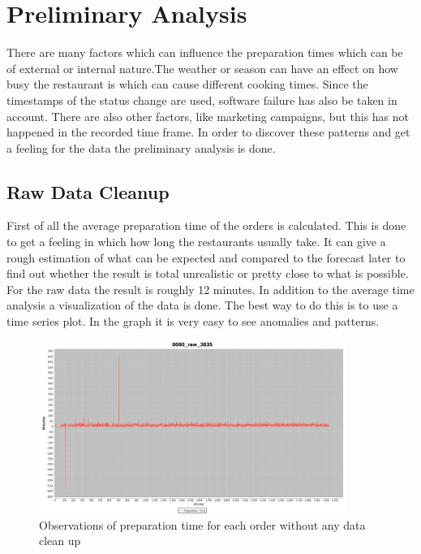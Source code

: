 \section{Preliminary Analysis}\label{section:Preliminary Analysis}
There are many factors which can influence the preparation times which can be of external or internal nature.The weather or season can have an effect on how busy the restaurant is which can cause different cooking times. Since the timestamps of the status change are used, software failure has also be taken in account. There are also other factors, like marketing campaigns, but this has not happened in the recorded time frame. In order to discover these patterns and get a feeling for the data the preliminary analysis is done.
\subsection{Raw Data Cleanup}\label{subsection:Raw Data Cleanup}
First of all the average preparation time of the orders is calculated. This is done to get a feeling in which how long the restaurants usually take. It can give a rough estimation of what can be expected and compared to the forecast later to find out whether the result is total unrealistic or pretty close to what is possible. For the raw data the result is roughly 12 minutes.\newline
In addition to the average time analysis a visualization of the data is done. The best way to do this is to use a time series plot. In the graph it is very easy to see anomalies and patterns.

\begin{figure}[h]
\begin{center}
\includegraphics[width=10cm]{images/0000_raw_3035.png}
\caption{Observations of preparation time for each order without any data clean up}
\label{fig:0000_raw_3035.png}
\end{center}
\end{figure}

